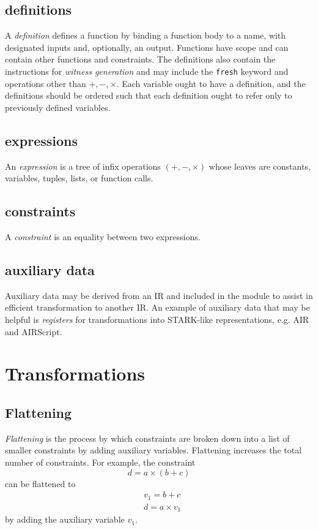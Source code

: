 \documentclass[
    9pt,            %
    techreport,        %
    affiltop,       %
]{art}
\begin{document}
\subsection{definitions}
A \emph{definition} defines a function by binding a function body to a name, with designated inputs and, optionally, an output. Functions have scope and can contain other functions and constraints. The definitions also contain the instructions for \emph{witness generation} and may include the \texttt{fresh} keyword and operations other than $+, -, \times$. Each variable ought to have a definition, and the definitions should be ordered such that each definition ought to refer only to previously defined variables.
\subsection{expressions}
An \emph{expression} is a tree of infix operations $(+, -, \times)$ whose leaves are constants, variables, tuples, lists, or function calls.

\subsection{constraints}
A \emph{constraint} is an equality between two expressions.

\subsection{auxiliary data}
Auxiliary data may be derived from an IR and included in the module to assist in efficient transformation to another IR. An example of auxiliary data that may be helpful is \emph{registers} for transformations into STARK-like representations, e.g. AIR and AIRScript.

\section{Transformations}

\subsection{Flattening}

\textit{Flattening} is the process by which constraints are broken down into a list of smaller constraints by adding auxiliary variables. Flattening increases the total number of constraints. For example, the constraint $$d = a\times(b+c)$$ can be flattened to 
\begin{equation*}
    \begin{split}
    & v_1 = b + c \\
    & d = a\times v_1
    \end{split}
\end{equation*}
by adding the auxiliary variable $v_1$.
\end{document}
